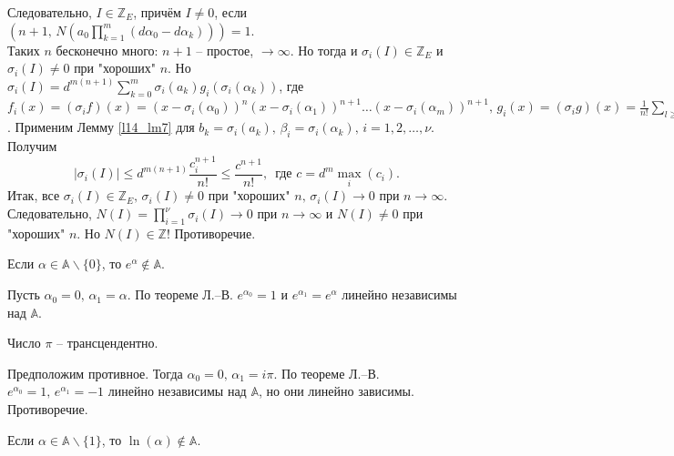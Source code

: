 \begin{pf}
	Следовательно, $I \in \mathbb{Z}_E$, причём $I \ne 0$, если $\displaystyle \left( n+1, \, N\left( a_0\prod\limits_{k=1}^m(d\alpha_0 - d\alpha_k) \right) \right) = 1$.\\
	Таких $n$ бесконечно много: $n+1$ -- простое, $\to \infty$. Но тогда и $\sigma_i(I) \in \mathbb{Z}_E$ и $\sigma_i(I) \ne 0$ при "хороших" $n$. Но $\displaystyle \sigma_i(I) = d^{m(n+1)} \sum\limits_{k=0}^m \sigma_i(a_k)g_i(\sigma_i(\alpha_k))$, где $f_i(x) = (\sigma_if)(x) = (x-\sigma_i(\alpha_0))^n(x-\sigma_i(\alpha_1))^{n+1}\dots(x-\sigma_i(\alpha_m))^{n+1}, \, g_i(x) = (\sigma_ig)(x) = \frac{1}{n!} \sum\limits_{l \geq n} f_i^{(l)}(x)$.
	Применим Лемму \ref{l14_lm7} для $b_k = \sigma_i(a_k), \, \beta_i = \sigma_i(\alpha_k), \, i=1,2,\dots,\nu$. Получим
	$$\left| \sigma_i(I) \right| \leq d^{m(n+1)}\frac{c_i^{n+1}}{n!} \leq \frac{c^{n+1}}{n!}, \, \text{ где } c=d^m\max\limits_i(c_i).$$
	Итак, все $\sigma_i(I) \in \mathbb{Z}_E, \, \sigma_i(I) \ne 0$ при "хороших" $n, \, \sigma_i(I) \to 0$ при $n \to \infty$.\\
	Следовательно, $\displaystyle N(I) = \prod\limits_{i=1}^\nu \sigma_i(I) \to 0$ при $n \to \infty$ и $N(I) \ne 0$ при "хороших" $n$. Но $N(I) \in \mathbb{Z}$!
	Противоречие.
\end{pf}

\begin{corollary}[из теоремы Л.--В.] \label{l14_cor1}
	Если $\alpha \in \mathbb{A} \backslash \{ 0 \}$, то $e^\alpha \not\in \mathbb{A}$.
\end{corollary}
\begin{pf}
	Пусть $\alpha_0 =0, \, \alpha_1=\alpha$. По теореме Л.--В. $e^{\alpha_0}=1$ и $e^{\alpha_1}=e^\alpha$ линейно независимы над $\mathbb{A}$.
\end{pf}

\begin{corollary} \label{l14_cor2}
	Число $\pi$ -- трансцендентно.
\end{corollary}
\begin{pf}
	Предположим противное. Тогда $\alpha_0 = 0, \, \alpha_1 = i\pi$. По теореме Л.--В.
	$e^{\alpha_0} = 1, \, e^{\alpha_1} = -1$ линейно независимы над $\mathbb{A}$, но они линейно зависимы.
	Противоречие.
\end{pf}

\begin{corollary} \label{l14_cor3}
	Если $\alpha \in \mathbb{A} \backslash \{ 1 \}$, то $\ln(\alpha) \not\in \mathbb{A}$.
\end{corollary}

